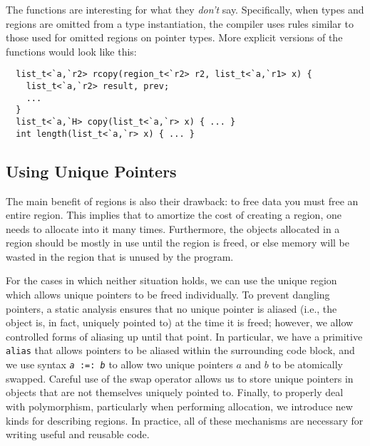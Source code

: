 The functions are interesting for what they \emph{don't} say.
Specifically, when types and regions are omitted from a type
instantiation, the compiler uses rules similar to those used for
omitted regions on pointer types.  More explicit versions of the
functions would look like this:
\begin{verbatim}
  list_t<`a,`r2> rcopy(region_t<`r2> r2, list_t<`a,`r1> x) {
    list_t<`a,`r2> result, prev;
    ...
  }
  list_t<`a,`H> copy(list_t<`a,`r> x) { ... }
  int length(list_t<`a,`r> x) { ... }
\end{verbatim}




\subsection{Using Unique Pointers}

The main benefit of regions is also their drawback: to free data you must
free an entire region.  This implies that to amortize the cost of creating a
region, one needs to allocate into it many times.  Furthermore, the objects
allocated in a region should be mostly in use until the region is freed, or
else memory will be wasted in the region that is unused by the program.

For the cases in which neither situation holds, we can use the unique region
which allows unique pointers to be freed individually.  To prevent dangling
pointers, a static analysis ensures that no unique pointer is aliased (i.e.,
the object is, in fact, uniquely pointed to) at the time it is freed;
however, we allow controlled forms of aliasing up until that point.  In
particular, we have a primitive \texttt{alias} that allows pointers to be
aliased within the surrounding code block, and we use syntax \texttt{{\it a}
:=: {\it b}} to allow two unique pointers $a$ and $b$ to be atomically
swapped.  Careful use of the swap operator allows us to store unique
pointers in objects that are not themselves uniquely pointed to.  Finally,
to properly deal with polymorphism, particularly when performing allocation,
we introduce new kinds for describing regions.  In practice, all of these
mechanisms are necessary for writing useful and reusable code.

